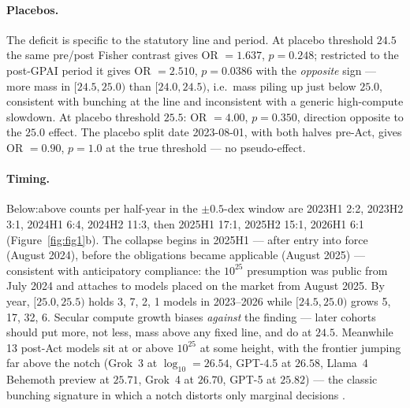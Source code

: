 \documentclass[11pt]{article}
\begin{document}
\paragraph{Placebos.} The deficit is specific to the statutory line and
period. At placebo threshold $24.5$ the same pre/post Fisher contrast gives
OR $=1.637$, $p=0.248$; restricted to the post-GPAI period it gives
OR $=2.510$, $p=0.0386$ with the \emph{opposite} sign --- more mass in
$[24.5, 25.0)$ than $[24.0, 24.5)$, i.e.\ mass piling up just below $25.0$,
consistent with bunching at the line and inconsistent with a generic
high-compute slowdown. At placebo threshold $25.5$: OR $=4.00$, $p=0.350$,
direction opposite to the $25.0$ effect. The placebo split date 2023-08-01,
with both halves pre-Act, gives OR $=0.90$, $p=1.0$ at the true threshold ---
no pseudo-effect.

\paragraph{Timing.} Below:above counts per half-year in the $\pm 0.5$-dex
window are 2023H1 2:2, 2023H2 3:1, 2024H1 6:4, 2024H2 11:3, then 2025H1
17:1, 2025H2 15:1, 2026H1 6:1 (Figure~\ref{fig:fig1}b). The collapse begins
in 2025H1 --- after entry into force (August 2024), before the obligations
became applicable (August 2025) --- consistent with anticipatory compliance:
the $10^{25}$ presumption was public from July 2024 and attaches to models
placed on the market from August 2025. By year, $[25.0, 25.5)$ holds 3, 7,
2, 1 models in 2023--2026 while $[24.5, 25.0)$ grows 5, 17, 32, 6. Secular
compute growth biases \emph{against} the finding --- later cohorts should put
more, not less, mass above any fixed line, and do at $24.5$. Meanwhile 13
post-Act models sit at or above $10^{25}$ at some height, with the frontier
jumping far above the notch (Grok~3 at $\log_{10}=26.54$, GPT-4.5 at
$26.58$, Llama~4 Behemoth preview at $25.71$, Grok~4 at $26.70$, GPT-5 at
$25.82$) --- the classic bunching signature in which a notch distorts only
marginal decisions \cite{klevenwaseem2013}.
\end{document}
